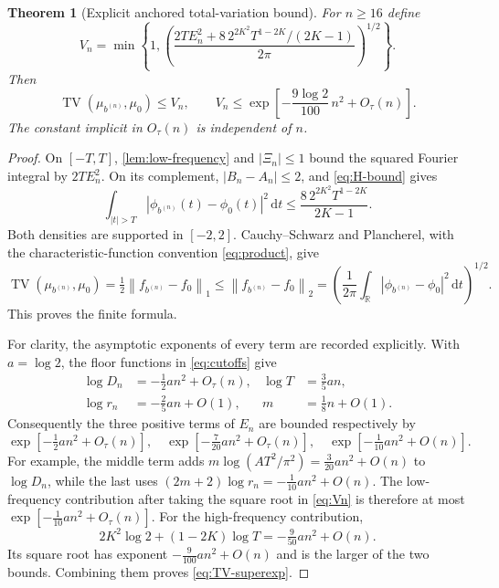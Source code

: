 \documentclass[11pt,a4paper]{article}
\numberwithin{equation}{section}
\newtheorem{theorem}{Theorem}[section]
\theoremstyle{definition}
\theoremstyle{remark}
\DeclareMathOperator{\TV}{TV}
\newcommand{\R}{\mathbb R}
\newcommand{\dd}{\,\mathrm d}
\newcommand{\norm}[1]{\left\lVert #1\right\rVert}
\begin{document}
\begin{theorem}[Explicit anchored total-variation bound]
\label{thm:TV-bound}
For $n\ge16$ define
\begin{equation}
 V_n=\min\left\{1,
 \left(\frac{2TE_n^2+
       8\,2^{2K^2}T^{1-2K}/(2K-1)}{2\pi}\right)^{1/2}\right\}.
 \label{eq:Vn}
\end{equation}
Then
\begin{equation}
 \TV(\mu_{b^{(n)}},\mu_0)\le V_n,
 \qquad
 V_n\le\exp\left[-\frac{9\log2}{100}\,n^2+O_\tau(n)\right].
 \label{eq:TV-superexp}
\end{equation}
The constant implicit in $O_\tau(n)$ is independent of $n$.
\end{theorem}
\begin{proof}
On $[-T,T]$, \cref{lem:low-frequency} and $|\Xi_n|\le1$ bound the
squared Fourier integral by $2TE_n^2$. On its complement,
$|B_n-A_n|\le2$, and \eqref{eq:H-bound} gives
\[
 \int_{|t|>T}|\phi_{b^{(n)}}(t)-\phi_0(t)|^2\dd t
 \le\frac{8\,2^{2K^2}T^{1-2K}}{2K-1}.
\]
Both densities are supported in $[-2,2]$. Cauchy--Schwarz and Plancherel,
with the characteristic-function convention \eqref{eq:product}, give
\[
 \TV(\mu_{b^{(n)}},\mu_0)
 =\tfrac12\norm{f_{b^{(n)}}-f_0}_1
 \le\norm{f_{b^{(n)}}-f_0}_2
 =\left(\frac1{2\pi}\int_{\R}
       |\phi_{b^{(n)}}-\phi_0|^2\dd t\right)^{1/2}.
\]
This proves the finite formula.

For clarity, the asymptotic exponents of every term are recorded explicitly.
With $a=\log2$, the floor functions in \eqref{eq:cutoffs} give
\begin{equation}
 \begin{aligned}
 \log D_n&=-\tfrac12 a n^2+O_\tau(n),
 &\log T&=\tfrac35 a n,\\
 \log r_n&=-\tfrac25 a n+O(1),
 &m&=\tfrac18 n+O(1).
 \end{aligned}
\end{equation}
Consequently the three positive terms of $E_n$ are bounded respectively by
\begin{equation}
 \exp[-\tfrac12 a n^2+O_\tau(n)],\quad
 \exp[-\tfrac7{20}a n^2+O_\tau(n)],\quad
 \exp[-\tfrac1{10}a n^2+O(n)].
 \label{eq:E-exponents}
\end{equation}
For example, the middle term adds
$m\log(AT^2/\pi^2)=\tfrac3{20}a n^2+O(n)$ to
$\log D_n$, while the last uses
$(2m+2)\log r_n=-\tfrac1{10}a n^2+O(n)$.
The low-frequency contribution after taking the square root in
\eqref{eq:Vn} is therefore at most
$\exp[-\tfrac1{10}a n^2+O_\tau(n)]$.
For the high-frequency contribution,
\[
 2K^2\log2+(1-2K)\log T=-\tfrac9{50}a n^2+O(n).
\]
Its square root has exponent $-\tfrac9{100}a n^2+O(n)$ and is the larger
of the two bounds. Combining them proves \eqref{eq:TV-superexp}.
\end{proof}
\end{document}
